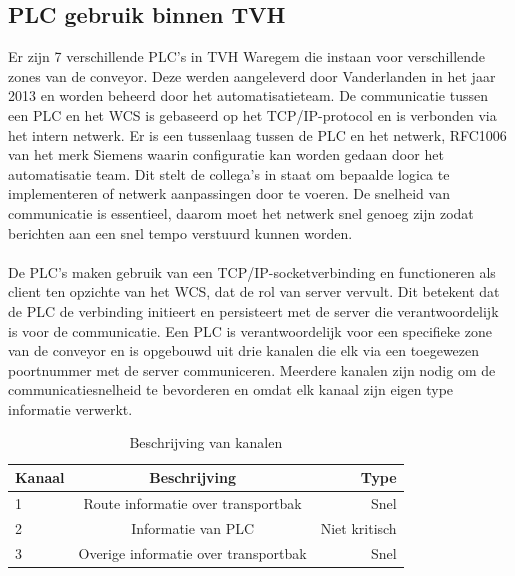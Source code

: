 \subsection{PLC gebruik binnen TVH}
Er zijn 7 verschillende PLC's in TVH Waregem die instaan voor verschillende zones van de conveyor.
Deze werden aangeleverd door Vanderlanden in het jaar 2013 en worden beheerd door het automatisatieteam.
De communicatie tussen een PLC en het WCS is gebaseerd op het TCP/IP-protocol en is verbonden via het intern netwerk.
Er is een tussenlaag tussen de PLC en het netwerk, RFC1006 van het merk Siemens waarin configuratie kan worden gedaan door het automatisatie team.
Dit stelt de collega's in staat om bepaalde logica te implementeren of netwerk aanpassingen door te voeren.
De snelheid van communicatie is essentieel, daarom moet het netwerk snel genoeg zijn zodat berichten aan een snel tempo verstuurd kunnen worden.
\\\\
De PLC's maken gebruik van een TCP/IP-socketverbinding en functioneren als client ten opzichte van het WCS, dat de rol van server vervult. 
Dit betekent dat de PLC de verbinding initieert en persisteert met de server die verantwoordelijk is voor de communicatie.
Een PLC is verantwoordelijk voor een specifieke zone van de conveyor en is opgebouwd uit drie kanalen die elk via een toegewezen poortnummer met de server communiceren. 
Meerdere kanalen zijn nodig om de communicatiesnelheid te bevorderen en omdat elk kanaal zijn eigen type informatie verwerkt.

\begin{table}[!h]
  \centering
  \begin{tabular}{lcr}
    \toprule
    \textbf{Kanaal} & \textbf{Beschrijving} & \textbf{Type}                        \\
    \midrule
    1                & Route informatie over transportbak          & Snel           \\
    2                & Informatie van PLC                          & Niet kritisch  \\
    3                & Overige informatie over transportbak        & Snel           \\
    \bottomrule
  \end{tabular}
  \caption[Channel assignment]{\label{tab:channel-assignment}Beschrijving van kanalen}
\end{table}

